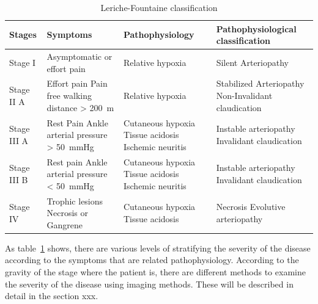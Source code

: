 \begin{table}
\caption{Leriche-Fountaine classification}
\centering
\label{table:Fountaine}
\begin{tabular}{p{1.8cm} p{3.8cm} p{3.5cm} p{4.5cm}}
\toprule
\textbf{Stages}& \textbf{Symptoms} & \textbf{Pathophysiology} & \textbf{Pathophysiological \newline classification} \\
\midrule
Stage I & Asymptomatic \newline or effort pain & Relative hypoxia & Silent Arteriopathy \\
\midrule
Stage II A & Effort pain \newline Pain free walking distance > \SI{200}{\meter} & Relative hypoxia & Stabilized Arteriopathy \newline Non-Invalidant claudication \\ 
\midrule
Stage III A & Rest Pain \newline Ankle arterial pressure > \SI{50}{\mmHg} & Cutaneous hypoxia \newline Tissue acidosis \newline Ischemic neuritis & Instable arteriopathy \newline Invalidant claudication \\
\midrule
Stage III B & Rest pain \newline Ankle arterial pressure < \SI{50}{\mmHg} & Cutaneous hypoxia \newline Tissue acidosis \newline Ischemic neuritis & Instable arteriopathy \newline
Invalidant claudication \\
\midrule
Stage IV & Trophic lesions \newline Necrosis or Gangrene & Cutaneous hypoxia \newline 
Tissue acidosis & Necrosis \newline Evolutive arteriopathy \\
\bottomrule
\end{tabular}
\end{table}

As table~\ref{table:Fountaine} shows, there are various levels of stratifying the severity of the disease according to the symptoms that are related pathophysiology. According to the gravity of the stage where the patient is, there are different methods to examine the severity of the disease using imaging methods. These will be described in detail in the section xxx.

